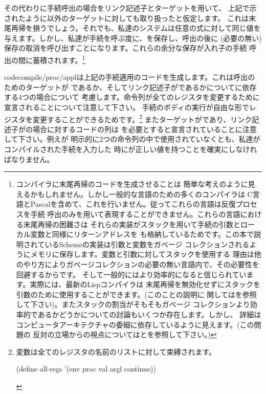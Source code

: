 その代わりに手続呼出の場合をリンク記述子とターゲットを用いて、
上記で示されたように以外のターゲットに対しても取り扱ったと仮定します。
これは末尾再帰を損うでしょう。それでも、私達のシステムは任意の式に対して同じ値を
与えます。しかし、私達が手続を呼ぶ度に、を保存し、呼出の後に
(必要の無い)保存の取消を呼び出すことになります。これらの余分な保存が入れ子の手続
呼出の間に蓄積されます。\footnote{コンパイラに末尾再帰のコードを生成させることは
簡単な考えのように見えるかもしれません。しかし一般的な言語のための多くのコンパイラは
C言語とPascalを含めて、これを行いません。従ってこれらの言語は反復プロセスを手続
呼出のみを用いて表現することができません。これらの言語における末尾再帰の困難さは
それらの実装がスタックを用いて手続の引数とローカル変数と同様にリターンアドレスを
も格納しているためです。この本で説明されているSchemeの実装は引数と変数をガベージ
コレクションされるようにメモリに保存します。変数と引数に対してスタックを使用する
理由は他のやり方によりガベージコレクションの必要の無い言語内で、その必要性を回避するからです。
そして一般的にはより効率的になると信じられています。実際には、最新のLispコンパイラは
末尾再帰を無効化せずにスタックを引数のために使用することができます。(このことの説明に
関してはを参照して下さい)。またスタックの割当がそもそもガベージ
コレクションより効率的であるかどうかについての討論もいくつか存在します。しかし、
詳細はコンピュータアーキテクチャの委細に依存しているように見えます。(この問題の
反対の立場からの視点についてはとを参照して下さい。)}

code{compile\-/proc\-/appl}は上記の手続適用のコードを生成します。これは呼出のためのターゲットが
であるか、そしてリンク記述子がであるかについてに依存する4つの場合について
考慮します。命令列が全てのレジスタを変更するために宣言されることについて注意して下さい。
手続のボディの実行が自由な形でレジスタを変更することができるためです。\footnote{
変数は全てのレジスタの名前のリストに対して束縛されます。

\begin{smallscheme}
(define all-regs '(env proc val argl continue))
\end{smallscheme}
}
またターゲットがであり、リンク記述子がの場合に対するコードの列は
を必要とすると宣言されていることに注意して下さい。例えが
明示的に2つの命令列の中で使用されていなくとも、私達がコンパイルされた手続を入力した
時にが正しい値を持つことを確実にしなければなりません。

